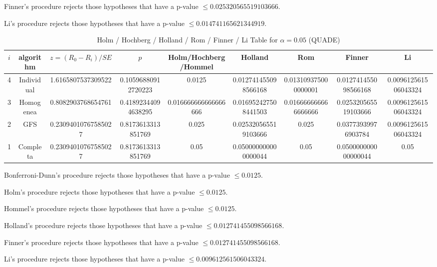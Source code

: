\documentclass[a4paper,10pt]{article}
\begin{document}
\begin{landscape}
Finner's procedure rejects those hypotheses that have a p-value $\le0.025320565519103666$.


Li's procedure rejects those hypotheses that have a p-value $\le0.014741165621344919$.



\newpage

\begin{table}[!htp]
\centering\scriptsize
\caption{Holm / Hochberg / Holland / Rom / Finner / Li Table for $\alpha=0.05$ (QUADE)}
\begin{tabular}{ccccccccc}
$i$&algorithm&$z=(R_0 - R_i)/SE$&$p$&Holm/Hochberg/Hommel&Holland&Rom&Finner&Li\\
\hline
4&Individual&1.6165807537309522&0.10596880912720223&0.0125&0.012741455098566168&0.013109375000000001&0.012741455098566168&0.009612561506043324\\
3&Homogenea&0.8082903768654761&0.41892344094638295&0.016666666666666666&0.016952427508441503&0.016666666666666666&0.025320565519103666&0.009612561506043324\\
2&GFS&0.23094010767585027&0.8173613313851769&0.025&0.025320565519103666&0.025&0.03773939976903784&0.009612561506043324\\
1&Completa&0.23094010767585027&0.8173613313851769&0.05&0.050000000000000044&0.05&0.050000000000000044&0.05\\
\hline
\end{tabular}
\end{table}
Bonferroni-Dunn's procedure rejects those hypotheses that have a p-value $\le0.0125$.


Holm's procedure rejects those hypotheses that have a p-value $\le0.0125$.


Hommel's procedure rejects those hypotheses that have a p-value $\le0.0125$.


Holland's procedure rejects those hypotheses that have a p-value $\le0.012741455098566168$.


Finner's procedure rejects those hypotheses that have a p-value $\le0.012741455098566168$.


Li's procedure rejects those hypotheses that have a p-value $\le0.009612561506043324$.



\newpage


\end{landscape}
\end{document}
